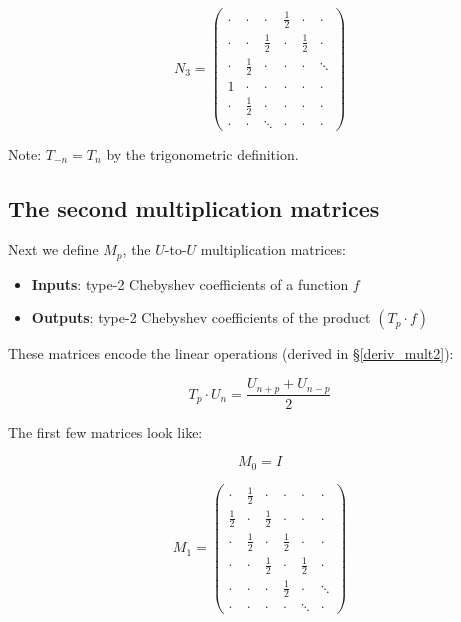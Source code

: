 \documentclass{article}
\begin{document}
\begin{equation*}
\renewcommand*{\arraystretch}{1.2}
N_3 =
\begin{pmatrix}
\cdot & \cdot & \cdot & \frac{1}{2} & \cdot & \cdot \\
\cdot & \cdot & \frac{1}{2} & \cdot & \frac{1}{2} & \cdot \\
\cdot & \frac{1}{2} & \cdot & \cdot & \cdot & \ddots \\
1 & \cdot & \cdot & \cdot & \cdot & \cdot \\
\cdot & \frac{1}{2} & \cdot & \cdot & \cdot & \cdot \\
\cdot & \cdot & \ddots & \cdot & \cdot & \cdot
\end{pmatrix}
\end{equation*}

Note: $T_{-n} = T_n$ by the trigonometric definition.

\subsection{The second multiplication matrices}

Next we define $M_p$, the $U$-to-$U$ multiplication matrices:

\begin{itemize}
    \item \textbf{Inputs}: type-2 Chebyshev coefficients of a function $f$
    \item \textbf{Outputs}: type-2 Chebyshev coefficients of the product $(T_p \cdot f)$
\end{itemize}

These matrices encode the linear operations (derived in \S \ref{deriv_mult2}):

\begin{equation*}
T_p \cdot U_n = \frac{U_{n+p} + U_{n-p}}{2}
\end{equation*}

The first few matrices look like:

\begin{equation*}
M_0 = I
\end{equation*}

\begin{equation*}
\renewcommand*{\arraystretch}{1.2}
M_1 =
\begin{pmatrix}
\cdot & \frac{1}{2} & \cdot & \cdot & \cdot & \cdot \\
\frac{1}{2} & \cdot & \frac{1}{2} & \cdot & \cdot & \cdot \\
\cdot & \frac{1}{2} & \cdot & \frac{1}{2} & \cdot & \cdot \\
\cdot & \cdot & \frac{1}{2} & \cdot & \frac{1}{2} & \cdot \\
\cdot & \cdot & \cdot & \frac{1}{2} & \cdot & \ddots \\
\cdot & \cdot & \cdot & \cdot & \ddots & \cdot
\end{pmatrix}
\end{equation*}
\end{document}
